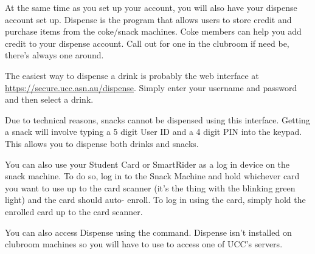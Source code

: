 

At the same time as you set up your account, you will also have your dispense account set up. Dispense is the program that allows users to store credit and purchase items from the coke/snack machines. Coke members can help you add credit to your dispense account. Call out for one in the clubroom if need be, there's always one around.


The easiest way to dispense a drink is probably the web interface at \url{https://secure.ucc.asn.au/dispense}. Simply enter your username and password and then select a drink. 

Due to technical reasons, snacks cannot be dispensed using this interface. Getting a snack will involve typing a 5 digit User ID and a 4 digit PIN into the keypad. This allows you to dispense both drinks and snacks.

You can also use your Student Card or SmartRider as a log in device on the snack machine. To do so, log in to the Snack Machine and hold whichever card you want to use up to the card scanner (it's the thing with the blinking green light) and the card should auto- enroll. To log in using the card, simply hold the enrolled card up to the card scanner.


You can also access Dispense using the  command. Dispense isn't installed on clubroom machines so you will have to use  to access one of UCC's servers.






